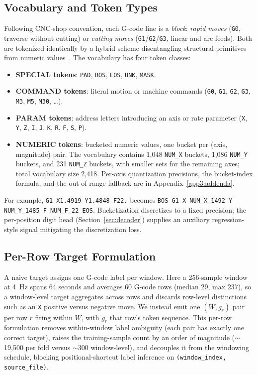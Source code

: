 \documentclass[sensors,article,submit,moreauthors,pdftex]{Definitions/mdpi}
\begin{document}
\subsection{Vocabulary and Token Types}
\label{sec:problem-vocab}

Following CNC-shop convention, each G-code line is a \emph{block}: \emph{rapid moves} (\texttt{G0}, traverse without cutting) or \emph{cutting moves} (\texttt{G1}/\texttt{G2}/\texttt{G3}, linear and arc feeds). Both are tokenized identically by a hybrid scheme disentangling structural primitives from numeric values~\cite{grammar_paper,gcode_foundational}. The vocabulary has four token classes:
\begin{itemize}
\item \textbf{SPECIAL tokens}: \texttt{PAD}, \texttt{BOS}, \texttt{EOS}, \texttt{UNK}, \texttt{MASK}.
\item \textbf{COMMAND tokens}: literal motion or machine commands (\texttt{G0}, \texttt{G1}, \texttt{G2}, \texttt{G3}, \texttt{M3}, \texttt{M5}, \texttt{M30}, \ldots).
\item \textbf{PARAM tokens}: address letters introducing an axis or rate parameter (\texttt{X}, \texttt{Y}, \texttt{Z}, \texttt{I}, \texttt{J}, \texttt{K}, \texttt{R}, \texttt{F}, \texttt{S}, \texttt{P}).
\item \textbf{NUMERIC tokens}: bucketed numeric values, one bucket per (axis, magnitude) pair. The vocabulary contains 1{,}048 \texttt{NUM\_X} buckets, 1{,}086 \texttt{NUM\_Y} buckets, and 231 \texttt{NUM\_Z} buckets, with smaller sets for the remaining axes; total vocabulary size 2{,}418. Per-axis quantization precisions, the bucket-index formula, and the out-of-range fallback are in Appendix~\ref{app3:addenda}.
\end{itemize}

For example, \texttt{G1 X1.4919 Y1.4848 F22.} becomes \texttt{BOS G1 X NUM\_X\_1492 Y NUM\_Y\_1485 F NUM\_F\_22 EOS}. Bucketization discretizes to a fixed precision; the per-position digit head (Section~\ref{sec:decoder}) supplies an auxiliary regression-style signal mitigating the discretization loss.

\subsection{Per-Row Target Formulation}
\label{sec:per-row}

A naive target assigns one G-code label per window. Here a 256-sample window at 4~Hz spans 64 seconds and averages 60 G-code rows (median 29, max 237), so a window-level target aggregates across rows and discards row-level distinctions such as an \texttt{X} positive versus negative move. We instead emit one $(W, g_r)$ pair per row $r$ firing within $W$, with $g_r$ that row's token sequence. This per-row formulation removes within-window label ambiguity (each pair has exactly one correct target), raises the training-sample count by an order of magnitude ($\sim$19{,}500 per fold versus $\sim$300 window-level), and decouples it from the windowing schedule, blocking positional-shortcut label inference on \texttt{(window\_index, source\_file)}.
\end{document}
